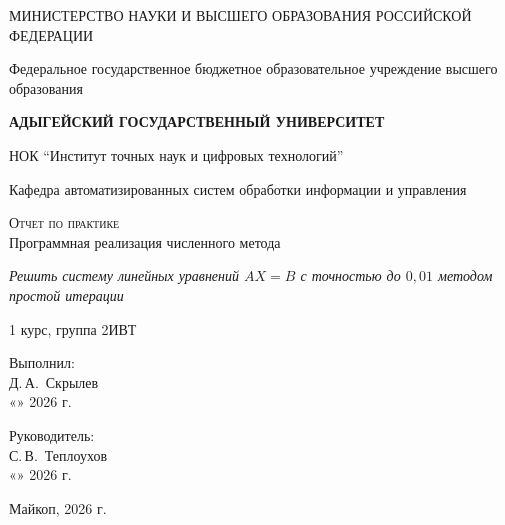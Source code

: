 \documentclass[12pt,a4paper]{article}
\newcommand{\StudentName}{Д.\,А.~Скрылев}
\newcommand{\StudentCourse}{1}
\newcommand{\StudentGroup}{2ИВТ}
\newcommand{\SupervisorName}{С.\,В.~Теплоухов}
\newcommand{\ReportCity}{Майкоп}
\newcommand{\ReportYear}{2026}
\newlength{\SignatureDateWidth}
\newcommand{\SignatureDateSlot}{«\underline{\hspace{0.7cm}}» \underline{\hspace{2cm}} \ReportYear{} г.}
\begin{document}

\begin{titlepage}
\begin{center}
\large
МИНИСТЕРСТВО НАУКИ И ВЫСШЕГО ОБРАЗОВАНИЯ РОССИЙСКОЙ ФЕДЕРАЦИИ

Федеральное государственное бюджетное образовательное учреждение высшего образования

\textbf{АДЫГЕЙСКИЙ ГОСУДАРСТВЕННЫЙ УНИВЕРСИТЕТ}

\vspace{0.25cm}

НОК ``Институт точных наук и цифровых технологий''

Кафедра автоматизированных систем обработки информации и управления

\vfill

\textsc{Отчет по практике}\\[5mm]

{\LARGE Программная реализация численного метода}\\[3mm]
\begin{minipage}{0.92\textwidth}
\centering
{\Large\textit{Решить систему линейных уравнений \(AX=B\) с точностью до \(0{,}01\) методом простой итерации}}
\end{minipage}

\StudentCourse{} курс, группа \StudentGroup

\end{center}
\vfill

\hfill\begin{minipage}{0.5\textwidth}
Выполнил:\\
\underline{\hspace{\SignatureDateWidth}} \StudentName\\
\SignatureDateSlot
\end{minipage}%
\bigskip

\hfill\begin{minipage}{0.5\textwidth}
Руководитель:\\
\underline{\hspace{\SignatureDateWidth}} \SupervisorName\\
\SignatureDateSlot
\end{minipage}%

\vfill

\begin{center}
\ReportCity, \ReportYear{} г.
\end{center}
\end{titlepage}
\end{document}
